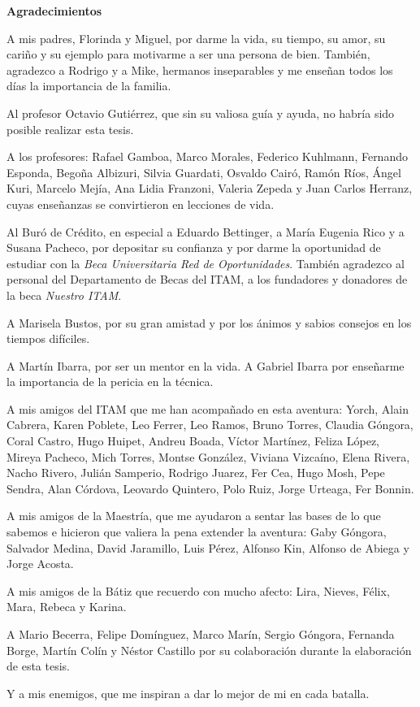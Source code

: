 \begin{center}
{\huge \bfseries Agradecimientos\\}
\end{center}

A mis padres, Florinda y Miguel, por darme la vida, su tiempo, su amor, su cariño y su ejemplo para motivarme a ser una persona de bien. También, agradezco a Rodrigo y a Mike, hermanos inseparables y me enseñan todos los días la importancia de la familia.

Al profesor Octavio Gutiérrez, que sin su valiosa guía y ayuda, no habría sido posible realizar esta tesis.

A los profesores: Rafael Gamboa, Marco Morales, Federico Kuhlmann, Fernando Esponda, Begoña Albizuri, Silvia Guardati, Osvaldo Cairó, Ramón Ríos, Ángel Kuri, Marcelo Mejía, Ana Lidia Franzoni, Valeria Zepeda y Juan Carlos Herranz, cuyas enseñanzas se convirtieron en lecciones de vida.

Al Buró de Crédito, en especial a Eduardo Bettinger, a María Eugenia Rico y a Susana Pacheco, por depositar su confianza y por darme la oportunidad de estudiar con la \emph{Beca Universitaria Red de Oportunidades}. También agradezco al personal del Departamento de Becas del ITAM, a los fundadores y donadores de la beca \emph{Nuestro ITAM}.

A Marisela Bustos, por su gran amistad y por los ánimos y sabios consejos en los tiempos difíciles.

A Martín Ibarra, por ser un mentor en la vida. A Gabriel Ibarra por enseñarme la importancia de la pericia en la técnica.

A mis amigos del ITAM que me han acompañado en esta aventura: Yorch, Alain Cabrera, Karen Poblete, Leo Ferrer, Leo Ramos, Bruno Torres, Claudia Góngora, Coral Castro, Hugo Huipet, Andreu Boada, Víctor Martínez, Feliza López, Mireya Pacheco, Mich Torres, Montse González, Viviana Vizcaíno, Elena Rivera, Nacho Rivero, Julián Samperio, Rodrigo Juarez, Fer Cea, Hugo Mosh, Pepe Sendra, Alan Córdova, Leovardo Quintero, Polo Ruiz, Jorge Urteaga, Fer Bonnin.

A mis amigos de la Maestría, que me ayudaron a sentar las bases de lo que sabemos e hicieron que valiera la pena extender la aventura: Gaby Góngora, Salvador Medina, David Jaramillo, Luis Pérez, Alfonso Kin, Alfonso de Abiega y Jorge Acosta.

A mis amigos de la Bátiz que recuerdo con mucho afecto: Lira, Nieves, Félix, Mara, Rebeca y Karina.

A Mario Becerra, Felipe Domínguez, Marco Marín, Sergio Góngora, Fernanda Borge, Martín Colín y Néstor Castillo por su colaboración durante la elaboración de esta tesis.

Y a mis enemigos, que me inspiran a dar lo mejor de mi en cada batalla.
\clearpage